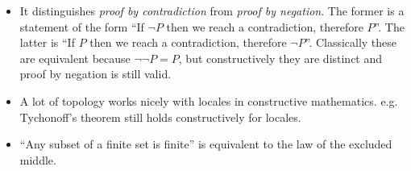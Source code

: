 \begin{itemize}
\item It distinguishes \emph{proof by contradiction} from \emph{proof by negation}.
The former is a statement of the form ``If \(\lnot P\) then we reach a contradiction, therefore \(P\)''.
The latter is ``If \(P\) then we reach a contradiction, therefore \(\lnot P\)''.
Classically these are equivalent because \(\lnot \lnot P = P\),
but constructively they are distinct and proof by negation is still valid.
\item A lot of topology works nicely with locales in constructive mathematics.
e.g. Tychonoff's theorem still holds constructively for locales.
\item ``Any subset of a finite set is finite'' is equivalent to the law of the excluded middle.
\end{itemize}


